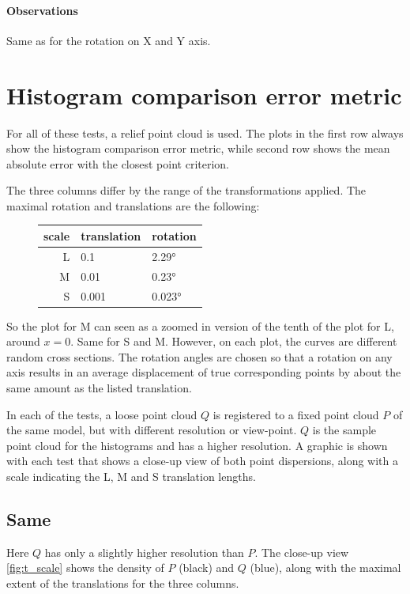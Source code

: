 {\paragraph{Observations} Same as for the rotation on X and Y axis.


\newpage

\section{Histogram comparison error metric} \label{sec:chi_err}
For all of these tests, a relief point cloud is used. The plots in the first row always show the histogram comparison error metric, while second row shows the mean absolute error with the closest point criterion.

The three columns differ by the range of the transformations applied. The maximal rotation and translations are the following:

\begin{figure}[H]
\centering
\begin{tabularx}{.4\textwidth}{|r|X|X|} \hline
scale  & translation & rotation \\ \hline
L      & 0.1         & 2.29\si{\degree} \\
M      & 0.01        & 0.23\si{\degree} \\
S      & 0.001       & 0.023\si{\degree} \\ \hline
\end{tabularx}
\end{figure}

So the plot for M can seen as a zoomed in version of the tenth of the plot for L, around $x = 0$. Same for S and M. However, on each plot, the curves are different random cross sections. The rotation angles are chosen so that a rotation on any axis results in an average displacement of true corresponding points by about the same amount as the listed translation.

In each of the tests, a loose point cloud $Q$ is registered to a fixed point cloud $P$ of the same model, but with different resolution or view-point. $Q$ is the sample point cloud for the histograms and has a higher resolution. A graphic is shown with each test that shows a close-up view of both point dispersions, along with a scale indicating the L, M and S translation lengths.



\subsection{Same}
Here $Q$ has only a slightly higher resolution than $P$. The close-up view \ref{fig:t_scale} shows the density of $P$ (black) and $Q$ (blue), along with the maximal extent of the translations for the three columns. 

}
